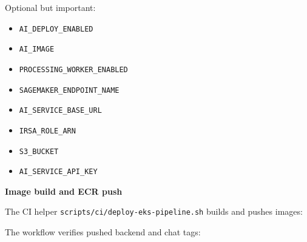 Optional but important:

\begin{itemize}
\tightlist
\item
  \texttt{AI\_\allowbreak{}DEPLOY\_\allowbreak{}ENABLED}
\item
  \texttt{AI\_\allowbreak{}IMAGE}
\item
  \texttt{PROCESSING\_\allowbreak{}WORKER\_\allowbreak{}ENABLED}
\item
  \texttt{SAGEMAKER\_\allowbreak{}ENDPOINT\_\allowbreak{}NAME}
\item
  \texttt{AI\_\allowbreak{}SERVICE\_\allowbreak{}BASE\_\allowbreak{}URL}
\item
  \texttt{IRSA\_\allowbreak{}ROLE\_\allowbreak{}ARN}
\item
  \texttt{S3\_\allowbreak{}BUCKET}
\item
  \texttt{AI\_\allowbreak{}SERVICE\_\allowbreak{}API\_\allowbreak{}KEY}
\end{itemize}

\vspace{0.5em}\noindent\textbf{Image build and ECR push}\par

The CI helper \texttt{scripts/\allowbreak{}ci/\allowbreak{}deploy-\allowbreak{}eks-\allowbreak{}pipeline.\allowbreak{}sh} builds and
pushes images:

\begin{Shaded}
\begin{Highlighting}[]
\end{Highlighting}
\end{Shaded}

The workflow verifies pushed backend and chat tags:

\begin{Shaded}
\begin{Highlighting}[]
\DataTypeTok{\textbackslash{}}
  \DataTypeTok{\textbackslash{}}
  \DataTypeTok{\textbackslash{}}
  \OperatorTok{\textless{}}\OperatorTok{\textgreater{}}

\DataTypeTok{\textbackslash{}}
  \DataTypeTok{\textbackslash{}}
  \DataTypeTok{\textbackslash{}}
  \OperatorTok{\textless{}}\OperatorTok{\textgreater{}}
\end{Highlighting}
\end{Shaded}

